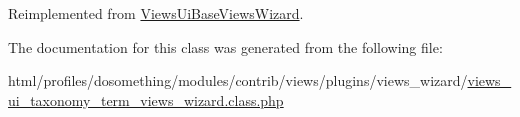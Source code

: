 Reimplemented from \hyperlink{classViewsUiBaseViewsWizard_a862c9e72a5e11fd78baa1992581f1410}{ViewsUiBaseViewsWizard}.

The documentation for this class was generated from the following file:\begin{DoxyCompactItemize}
\item 
html/profiles/dosomething/modules/contrib/views/plugins/views\_\-wizard/\hyperlink{views__ui__taxonomy__term__views__wizard_8class_8php}{views\_\-ui\_\-taxonomy\_\-term\_\-views\_\-wizard.class.php}\end{DoxyCompactItemize}
